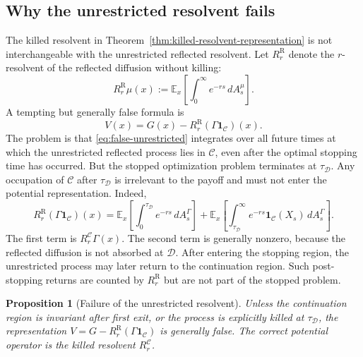 \documentclass[pdflatex,sn-mathphys-num]{sn-jnl}
\theoremstyle{plain}
\newtheorem{proposition}[theorem]{Proposition}
\theoremstyle{definition}
\theoremstyle{remark}
\numberwithin{equation}{section}
\begin{document}
\subsection{Why the unrestricted resolvent fails} \label{subsec:unrestricted-resolvent-fails} 

The killed resolvent in Theorem~\ref{thm:killed-resolvent-representation} is not interchangeable with the unrestricted reflected resolvent. Let \(R_r^{\mathrm R}\) denote the \(r\)-resolvent of the reflected diffusion without killing: 
\begin{equation} \label{eq:unrestricted-resolvent} 
R_r^{\mathrm R}\mu(x) := \mathbb E_x \left[ \int_0^\infty e^{-rs}\,dA_s^\mu \right]. 
\end{equation} 
A tempting but generally false formula is 
\begin{equation} \label{eq:false-unrestricted} 
V(x) = G(x)-R_r^{\mathrm R}(\Gamma\mathbf 1_{\mathcal C})(x). \end{equation} 
The problem is that \eqref{eq:false-unrestricted} integrates over all future times at which the unrestricted reflected process lies in \(\mathcal C\), even after the optimal stopping time has occurred. But the stopped optimization problem terminates at \(\tau_{\mathcal D}\). Any occupation of \(\mathcal C\) after \(\tau_{\mathcal D}\) is irrelevant to the payoff and must not enter the potential representation. Indeed, 
\begin{equation}  \label{eq:resolvent-decomposition} 
R_r^{\mathrm R}(\Gamma\mathbf 1_{\mathcal C})(x) = \mathbb E_x \left[ \int_0^{\tau_{\mathcal D}}e^{-rs}\,dA_s^\Gamma \right] 
+ \mathbb E_x \left[ \int_{\tau_{\mathcal D}}^\infty e^{-rs}\mathbf 1_{\mathcal C}(X_s)\,dA_s^\Gamma \right].
\end{equation} 
The first term is \(R_r^{\mathcal C}\Gamma(x)\). The second term is generally nonzero, because the reflected diffusion is not absorbed at \(\mathcal D\). After entering the stopping region, the unrestricted process may later return to the continuation region. Such post-stopping returns are counted by \(R_r^{\mathrm R}\) but are not part of the stopped problem. 

\begin{proposition}[Failure of the unrestricted resolvent] \label{prop:failure-unrestricted-resolvent} 
Unless the continuation region is invariant after first exit, or the process is explicitly killed at \(\tau_{\mathcal D}\), the representation 
$V=G-R_r^{\mathrm R}(\Gamma\mathbf 1_{\mathcal C})$ is generally false. The correct potential operator is the killed resolvent \(R_r^{\mathcal C}\). 
\end{proposition} 
\end{document}

